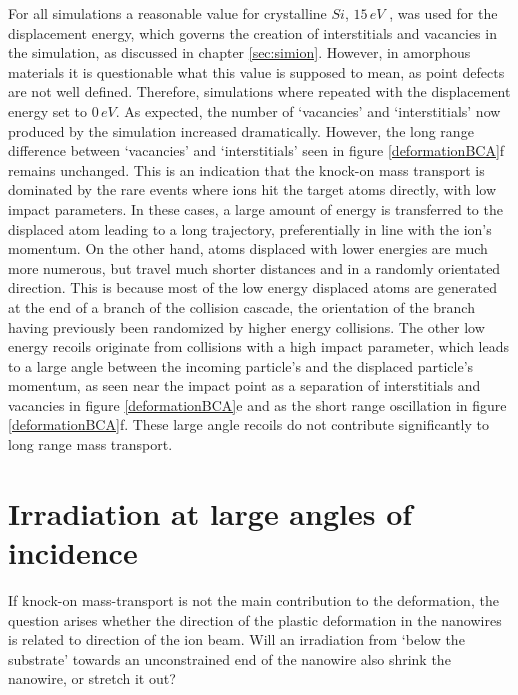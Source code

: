 For all simulations a reasonable value for crystalline $Si$, $15\,eV$ \cite{corbett_production_1965}, was used for the displacement energy, which governs the creation of interstitials and vacancies in the simulation, as discussed in chapter \ref{sec:simion}. However, in amorphous materials it is questionable what this value is supposed to mean, as point defects are not well defined. Therefore, simulations where repeated with the displacement energy set to $0\,eV$. As expected, the number of `vacancies' and `interstitials' now produced by the simulation increased dramatically. However, the long range difference between `vacancies' and `interstitials' seen in figure \ref{deformationBCA}f remains unchanged. This is an indication that the knock-on mass transport is dominated by the rare events where ions hit the target atoms directly, with low impact parameters. In these cases, a large amount of energy is transferred to the displaced atom leading to a long trajectory, preferentially in line with the ion's momentum. On the other hand, atoms displaced with lower energies are much more numerous, but travel much shorter distances and in a randomly orientated direction. This is because most of the low energy displaced atoms are generated at the end of a branch of the collision cascade, the orientation of the branch having previously been randomized by higher energy collisions. The other low energy recoils originate from collisions with a high impact parameter, which leads to a large angle between the incoming particle's and the displaced particle's momentum, as seen near the impact point as a separation of interstitials and vacancies in figure \ref{deformationBCA}e and as the short range oscillation in figure \ref{deformationBCA}f. These large angle recoils do not contribute significantly to long range mass transport.

\clearpage
\section{Irradiation at large angles of incidence}

If knock-on mass-transport is not the main contribution to the deformation, the question arises whether the direction of the plastic deformation in the nanowires is related to direction of the ion beam. Will an irradiation from `below the substrate' towards an unconstrained end of the nanowire also shrink the nanowire, or stretch it out? 

